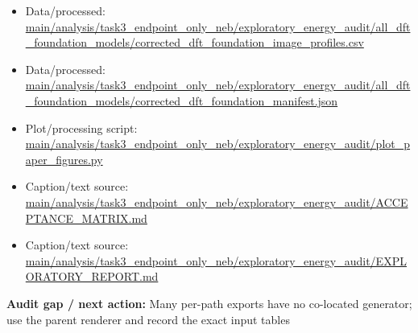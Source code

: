 \documentclass[10pt]{article}
\newcommand{\statusline}[1]{\colorbox{gray!12}{\parbox{0.96\linewidth}{#1}}}
\begin{document}
\begin{itemize}[leftmargin=1.4em,noitemsep]
\item Data/processed: \begingroup\scriptsize\url{main/analysis/task3_endpoint_only_neb/exploratory_energy_audit/all_dft_foundation_models/corrected_dft_foundation_image_profiles.csv}\endgroup
\item Data/processed: \begingroup\scriptsize\url{main/analysis/task3_endpoint_only_neb/exploratory_energy_audit/all_dft_foundation_models/corrected_dft_foundation_manifest.json}\endgroup
\item Plot/processing script: \begingroup\scriptsize\url{main/analysis/task3_endpoint_only_neb/exploratory_energy_audit/plot_paper_figures.py}\endgroup
\item Caption/text source: \begingroup\scriptsize\url{main/analysis/task3_endpoint_only_neb/exploratory_energy_audit/ACCEPTANCE_MATRIX.md}\endgroup
\item Caption/text source: \begingroup\scriptsize\url{main/analysis/task3_endpoint_only_neb/exploratory_energy_audit/EXPLORATORY_REPORT.md}\endgroup
\end{itemize}
\statusline{\textbf{Audit gap / next action:} Many per-path exports have no co-located generator; use the parent renderer and record the exact input tables}
\vfill
\clearpage
\end{document}
